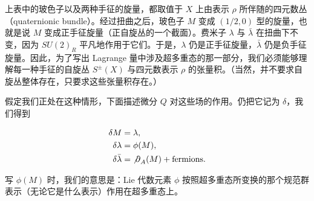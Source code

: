 
上表中的玻色子以及两种手征的旋量，都取值于 $X$ 上由表示 $\rho$ 所伴随的四元数丛（quaternionic bundle）。经过扭曲之后，玻色子 $M$ 变成 $(1/2,0)$ 型的旋量，也就是说 $M$ 变成正手征旋量（正自旋丛的一个截面）。费米子 $\lambda$ 与 $\bar\lambda$ 在扭曲下不变，因为 $SU(2)_R$ 平凡地作用于它们。于是，$\lambda$ 仍是正手征旋量，$\bar\lambda$ 仍是负手征旋量。因此，为了写出 Lagrange 量中涉及超多重态的那一部分，我们必须能够理解每一种手征的自旋丛 $S^\pm(X)$ 与四元数表示 $\rho$ 的张量积。（当然，并不要求自旋丛整体存在，只要求这些张量积存在。）

假定我们正处在这种情形，下面描述微分 $Q$ 对这些场的作用。仍把它记为 $\delta$，我们得到

\[
\begin{aligned}
  \delta M&=\lambda,\\
  \delta\lambda&=\phi(M),\\
  \delta\bar\lambda&={\not\partial}_A(M)+\text{fermions}.
\end{aligned}
\]

写 $\phi(M)$ 时，我们的意思是：Lie 代数元素 $\phi$ 按照超多重态所变换的那个规范群表示（无论它是什么表示）作用在超多重态上。


